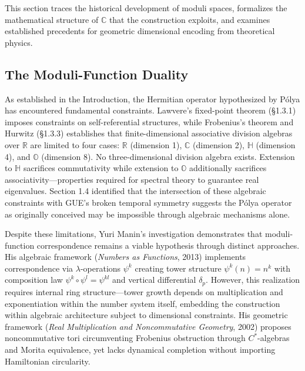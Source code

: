 \label{sec:background}

This section traces the historical development of moduli spaces, formalizes the mathematical structure of $\mathbb{C}$ that the construction exploits, and examines established precedents for geometric dimensional encoding from theoretical physics.

\subsection{The Moduli-Function Duality} \label{sec:moduli-function-duality}

As established in the Introduction, the Hermitian operator hypothesized by Pólya has encountered fundamental constraints. Lawvere's fixed-point theorem \cite{Lawvere1969} (\S 1.3.1) imposes constraints on self-referential structures, while Frobenius's theorem and Hurwitz \cite{Hurwitz1923} (\S 1.3.3) establishes that finite-dimensional associative division algebras over $\mathbb{R}$ are limited to four cases: $\mathbb{R}$ (dimension 1), $\mathbb{C}$ (dimension 2), $\mathbb{H}$ (dimension 4), and $\mathbb{O}$ (dimension 8). No three-dimensional division algebra exists. Extension to $\mathbb{H}$ sacrifices commutativity while extension to $\mathbb{O}$ additionally sacrifices associativity—properties required for spectral theory to guarantee real eigenvalues. Section 1.4 identified that the intersection of these algebraic constraints with GUE's broken temporal symmetry suggests the Pólya operator as originally conceived may be impossible through algebraic mechanisms alone.

Despite these limitations, Yuri Manin's investigation demonstrates that moduli-function correspondence remains a viable hypothesis through distinct approaches. His algebraic framework (\textit{Numbers as Functions}, 2013) implements correspondence via $\lambda$-operations $\psi^k$ creating tower structure $\psi^k(n) = n^k$ with composition law $\psi^k \circ \psi^l = \psi^{kl}$ and vertical differential $\delta_p$. However, this realization requires internal ring structure—tower growth depends on multiplication and exponentiation within the number system itself, embedding the construction within algebraic architecture subject to dimensional constraints. His geometric framework (\textit{Real Multiplication and Noncommutative Geometry}, 2002) proposes noncommutative tori circumventing Frobenius obstruction through $C^*$-algebras and Morita equivalence, yet lacks dynamical completion without importing Hamiltonian circularity.

